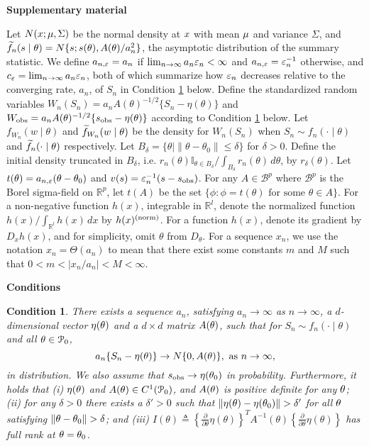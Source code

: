\documentclass{article}
\newtheorem{condition}{Condition}
\begin{document}
{\bf Supplementary material}


\noindent Let $N({}{x};{}{\mu},\Sigma)$ be the normal density at ${}{x}$
with mean ${}{\mu}$ and variance $\Sigma$, and $\widetilde{f}_{n}({}{s}\mid{}{\theta})=N\{{}{s};{}{s}({}{\theta}),A({}{\theta})/a_{n}^{2}\}$, the asymptotic distribution of the summary statistic.
We define $a_{n,\varepsilon}=a_{n}$ if $\lim_{n\rightarrow\infty}a_{n}\varepsilon_{n}<\infty$
and $a_{n,\varepsilon}=\varepsilon_{n}^{-1}$ otherwise, and $c_{\varepsilon}=\lim_{n\rightarrow\infty}a_{n}\varepsilon_{n}$,
both of which summarize how $\varepsilon_{n}$ decreases relative to the
converging rate, $a_{n}$, of $S_{n}$ in Condition \ref{sum_conv} below. Define
the standardized random variables $W_{n}(S_{n})=a_{n}A(\theta)^{-1/2}\{S_{n}-\eta(\theta)\}$
and $W_{\rm obs}=a_{n}A(\theta)^{-1/2}\{s_{\rm obs}-\eta(\theta)\}$
according to Condition \ref{sum_conv} below. Let $f_{W_{n}}(w\mid\theta)$ and
$\widetilde{f}_{W_{n}}(w\mid\theta)$ be the density for $W_{n}(S_{n})$ when
$S_{n}\sim f_{n}(\cdot\mid\theta)$ and $\widetilde{f}_n(\cdot\mid\theta)$ respectively.
Let $B_{\delta}=\{\theta\mid\|\theta-\theta_{0}\|\leq\delta\}$ for
$\delta>0$. Define the initial density truncated in $B_{\delta}$,
i.e. $r_{n}(\theta)\mathbb{I}_{\theta\in B_{\delta}}/\int_{B_{\delta}}r_{n}(\theta)\,d\theta$,
by $r_{\delta}(\theta)$. Let $t(\theta)=a_{n,\varepsilon}(\theta-\theta_{0})$
and $v(s)=\varepsilon_{n}^{-1}(s - s_{\rm obs})$. For any $A\in\mathscr{B}^{p}$
where $\mathscr{B}^{p}$ is the Borel sigma-field on $\mathbb{R}^{p}$,
let $t(A)$ be the set $\{\phi:\phi=t(\theta)\text{ for some }\theta\in A\}$.
For a non-negative function $h(x)$, integrable in $\mathbb{R}^{l}$,
denote the normalized function $h(x)/\int_{\mathbb{R}^{l}}h(x)\,dx$
by $h(x)^{({\rm norm})}$. For a function $h(x)$, denote its gradient
by $D_{x}h(x)$, and for simplicity, omit $\theta$ from $D_{\theta}$. For a sequence $x_n$, we use the notation $x_n = \Theta(a_n)$ to mean that there exist some constants $m$ and $M$ such that $0<m<\mid x_n/a_n \mid<M<\infty$.

{\bf Conditions}

\begin{condition} \label{sum_conv}
	There exists a sequence $a_{n}$, satisfying $a_{n}\rightarrow\infty$
	as $n\rightarrow\infty$, a $d$-dimensional vector $\eta({}{\theta})$
	and a $d\times d$ matrix $A({}{\theta})$, such that for $S_{n}\sim f_{n}(\cdot\mid\theta)$
	and all ${}{\theta}\in\mathcal{P}_{0}$, 
	\[
	a_{n}\{{}{S}_{n}-\eta({}{\theta})\}\rightarrow N\{0,A({}{\theta})\},\mbox{ as \ensuremath{n\rightarrow\infty}},
	\]
	in distribution. We also assume that ${}{s}_{\rm obs}\rightarrow\eta({}{\theta}_{0})$
	in probability. Furthermore, it holds that (i) $\eta({}{\theta})$
	and $A({}{\theta})\in C^{1}(\mathcal{P}_{0})$, and $A({}{\theta})$ is
	positive definite for any ${}{\theta}$; (ii) for any $\delta>0$ there
	exists a $\delta'>0$ such that $\|\eta(\btheta)-\eta(\btheta_{0})\|>\delta'$
	for all ${}{\theta}$ satisfying $\|\btheta-\btheta_{0}\|>\delta$; and
	(iii) $I(\theta)\triangleq\left\{ \frac{\partial}{\partial\theta}\eta(\theta)\right\} ^{T}A^{-1}(\theta)\left\{ \frac{\partial}{\partial\theta}\eta(\theta)\right\} $
	has full rank at ${}{\theta}={}{\theta}_{0}$.
\end{condition}
\end{document}
